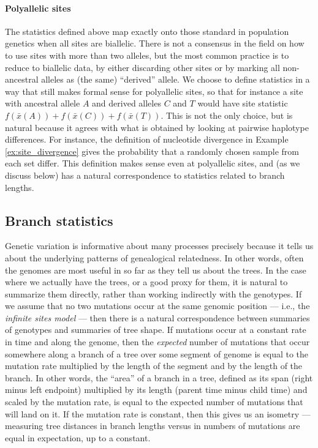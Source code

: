 \documentclass{article}
\newcommand{\aw}{{\bar x}} %
\begin{document}
\paragraph{Polyallelic sites}
The statistics defined above map exactly onto those standard in population genetics
when all sites are biallelic.
There is not a consensus in the field
on how to use sites with more than two alleles, but the most common practice is
to reduce to biallelic data, by either discarding other sites
or by marking all non-ancestral alleles as (the same) ``derived'' allele.
We choose to define statistics in a way that still makes formal sense for polyallelic sites,
so that for instance a site with ancestral allele $A$ and derived alleles $C$ and $T$
would have site statistic $f(\aw(A)) + f(\aw(C)) + f(\aw(T))$.
This is not the only choice, but is natural because it agrees with what is obtained by
looking at pairwise haplotype differences.
For instance, the definition of nucleotide divergence in Example \ref{ex:site_divergence}
gives the probability that a randomly chosen sample from each set differ.
This definition makes sense even at polyallelic sites,
and (as we discuss below) has a natural correspondence to statistics related to branch lengths.


\subsection*{Branch statistics}

Genetic variation is informative about many processes
precisely because it tells us about the underlying patterns of genealogical relatedness.
In other words, often the genomes are most useful in so far as they tell us about the trees.
In the case where we actually have the trees, or a good proxy for them,
it is natural to summarize them directly, rather than working indirectly with the genotypes.
If we assume that no two mutations occur at the same genomic position ---
i.e., the \emph{infinite sites model} ---
then there is a natural correspondence between summaries of genotypes and summaries of tree shape.
If mutations occur at a constant rate in time and along the genome,
then the \emph{expected} number of mutations that occur somewhere along a branch of a tree
over some segment of genome
is equal to the mutation rate multiplied by the length of the segment and by the length of the branch.
In other words, the ``area'' of a branch in a tree,
defined as its span (right minus left endpoint) multiplied by its length (parent time minus child time)
and scaled by the mutation rate,
is equal to the expected number of mutations that will land on it.
If the mutation rate is constant,
then this gives us an isometry ---
measuring tree distances in branch lengths versus in numbers of mutations
are equal in expectation, up to a constant.
\end{document}
